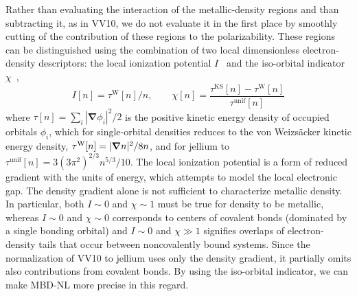 Rather than evaluating the interaction of the metallic-density regions and than subtracting it, as in VV10, we do not evaluate it in the first place by smoothly cutting of the contribution of these regions to the polarizability.
These regions can be distinguished using the combination of two local dimensionless electron-density descriptors: the local ionization potential $I$~\citep{GutleIJQC99} and the iso-orbital indicator $\chi$~\citep{BeckeJCP90,KummelMP03,SunPRL13},
\begin{equation}
  I[n]=\tau^\text{W}[n]/n,\qquad
  \chi[n]=\frac{\tau^\text{KS}[n]-\tau^\text{W}[n]}{\tau^\text{unif}[n]}
\end{equation}
where $\tau[n]=\sum_i|\boldsymbol\nabla\phi_i|^2/2$ is the positive kinetic energy density of occupied orbitals $\phi_i$, which for single-orbital densities reduces to the von Weizsäcker kinetic energy density, $\tau^\text W[n]=|\boldsymbol\nabla n|^2/8n$, and for jellium to $\tau^\mathrm{unif}[n]=3(3\pi^2)^{2/3}n^{5/3}/10$.  %
The local ionization potential is a form of reduced gradient with the units of energy, which attempts to model the local electronic gap.
The density gradient alone is not sufficient to characterize metallic density.
In particular, both $I\sim0$ and $\chi\sim1$ must be true for density to be metallic, whereas $I\sim0$ and $\chi\sim0$ corresponds to centers of covalent bonds (dominated by a single bonding orbital) and $I\sim0$ and $\chi\gg1$ signifies overlaps of electron-density tails that occur between noncovalently bound systems.
Since the normalization of VV10 to jellium uses only the density gradient, it partially omits also contributions from covalent bonds.
By using the iso-orbital indicator, we can make MBD-NL more precise in this regard.

